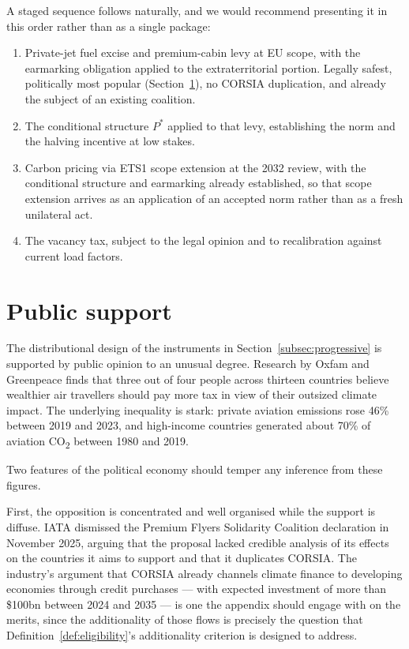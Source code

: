 \documentclass[11pt]{article}
\begin{document}
A staged sequence follows naturally, and we would recommend presenting it in
this order rather than as a single package:

\begin{enumerate}[label=\textbf{Stage \arabic*.},leftmargin=1.8cm]
  \item Private-jet fuel excise and premium-cabin levy at EU scope, with the
  earmarking obligation applied to the extraterritorial portion. Legally
  safest, politically most popular (Section~\ref{sec:support}), no CORSIA
  duplication, and already the subject of an existing coalition.
  \item The conditional structure $P^{*}$ applied to that levy, establishing the
  norm and the halving incentive at low stakes.
  \item Carbon pricing via ETS1 scope extension at the 2032 review, with the
  conditional structure and earmarking already established, so that scope
  extension arrives as an application of an accepted norm rather than as a fresh
  unilateral act.
  \item The vacancy tax, subject to the legal opinion and to recalibration
  against current load factors.
\end{enumerate}

\section{Public support}
\label{sec:support}

The distributional design of the instruments in
Section~\ref{subsec:progressive} is supported by public opinion to an unusual
degree. Research by Oxfam and Greenpeace finds that three out of four people
across thirteen countries believe wealthier air travellers should pay more tax in
view of their outsized climate impact. The underlying inequality is stark:
private aviation emissions rose 46\% between 2019 and 2023, and high-income
countries generated about 70\% of aviation CO\textsubscript{2} between 1980 and
2019.

Two features of the political economy should temper any inference from these
figures.

First, the opposition is concentrated and well organised while the support is
diffuse. IATA dismissed the Premium Flyers Solidarity Coalition declaration in
November 2025, arguing that the proposal lacked credible analysis of its effects
on the countries it aims to support and that it duplicates CORSIA. The
industry's argument that CORSIA already channels climate finance to developing
economies through credit purchases --- with expected investment of more than
\$100bn between 2024 and 2035 --- is one the appendix should engage with on the
merits, since the additionality of those flows is precisely the question that
Definition~\ref{def:eligibility}'s additionality criterion is designed to
address.
\end{document}

